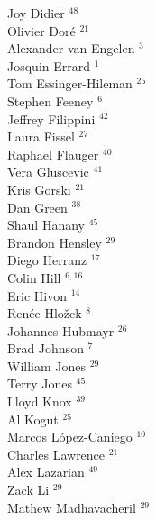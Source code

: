 \documentclass[PICOReport.tex]{subfiles}
\begin{document}
{\begin{multicols}{4}
Joy Didier $^{48}$                      \\
Olivier Dor\'e $^{21}$                  \\
Alexander van Engelen $^{3}$           \\
Josquin Errard $^{1}$                  \\
Tom Essinger-Hileman $^{25}$            \\
Stephen Feeney $^{6}$                  \\
Jeffrey Filippini $^{42}$               \\
Laura Fissel $^{27}$                    \\
Raphael Flauger $^{40}$                 \\
Vera Gluscevic $^{41}$                  \\
Kris Gorski $^{21}$                     \\
Dan Green $^{38}$                       \\
Shaul Hanany $^{45}$                    \\
Brandon Hensley $^{29}$                 \\
Diego Herranz $^{17}$                   \\
Colin Hill $^{6,16}$                      \\
Eric Hivon $^{14}$                      \\
Ren\'{e}e  Hlo\v{z}ek $^{8}$           \\
Johannes Hubmayr $^{26}$                \\
Brad Johnson $^{7}$                    \\
William Jones $^{29}$                   \\
Terry Jones $^{45}$                     \\
Lloyd Knox $^{39}$                      \\
Al Kogut $^{25}$                        \\
Marcos L\'{o}pez-Caniego $^{10}$        \\
Charles Lawrence $^{21}$                \\
Alex Lazarian $^{49}$                   \\
Zack Li $^{29}$                         \\
Mathew Madhavacheril $^{29}$            \\

\end{multicols}}
\end{document}
